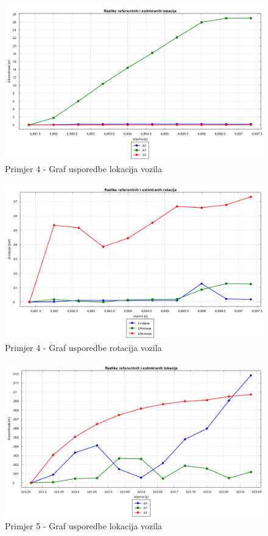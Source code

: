 \begin{figure}[H]
  \includegraphics[scale=0.4]{images/imgs/4_zavoj_lokacije.png}
  \caption{Primjer 4 - Graf usporedbe lokacija vozila}
  \label{eval:primjer_4_rotacija}
\end{figure}
\begin{figure}[H]
  \includegraphics[scale=0.4]{images/imgs/4_zavoj_rotacije.png}
  \caption{Primjer 4 - Graf usporedbe rotacija vozila}
  \label{eval:primjer_4_rotacija}
\end{figure}
\begin{figure}[H]
  \includegraphics[scale=0.4]{images/imgs/g1_lokacije.png}
  \caption{Primjer 5 - Graf usporedbe lokacija vozila}
  \label{eval:primjer_5_rotacija}
\end{figure}
